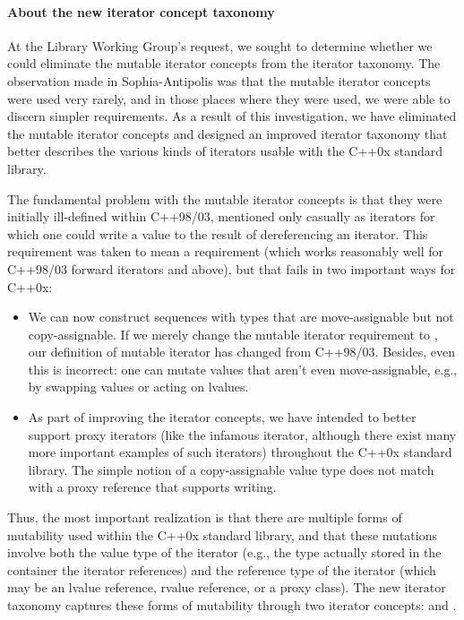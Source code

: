 \documentclass[american,twoside]{book}
\begin{document}
\begin{titlepage}
\paragraph*{About the new iterator concept taxonomy}
At the Library Working Group's request, we sought to determine whether
we could eliminate the mutable iterator concepts from the iterator
taxonomy. The observation made in Sophia-Antipolis was that the
mutable iterator concepts were used very rarely, and in those places
where they were used, we were able to discern simpler
requirements. As a result of this investigation, we have eliminated
the mutable iterator concepts and designed an improved iterator
taxonomy that better describes the various kinds of iterators usable
with the C++0x standard library.

The fundamental problem with the mutable iterator concepts is that
they were initially ill-defined within C++98/03, mentioned only
casually as iterators for which one could write a value to the result
of dereferencing an iterator. This requirement was taken to mean a
 requirement (which works reasonably well for
C++98/03 forward iterators and above), but that fails in two important
ways for C++0x:

\begin{itemize}
\item We can now construct sequences with types that are
  move-assignable but not copy-assignable. If we merely change the
  mutable iterator requirement to , our
  definition of mutable iterator has changed from C++98/03. Besides,
  even this is incorrect: one can mutate values that aren't even
  move-assignable, e.g., by swapping values or acting on lvalues.

\item As part of improving the iterator concepts, we have intended to
  better support proxy iterators (like the infamous
   iterator, although there exist many more
  important examples of such iterators) throughout the C++0x standard
  library. The simple notion of a copy-assignable value type does not
  match with a proxy reference that supports writing.
\end{itemize}

Thus, the most important realization is that there are multiple forms
of mutability used within the C++0x standard library, and that these
mutations involve both the value type of the iterator (e.g., the type
actually stored in the container the iterator references) and the
reference type of the iterator (which may be an lvalue reference,
rvalue reference, or a proxy class). The new iterator taxonomy
captures these forms of mutability through two iterator concepts:
 and .


\end{titlepage}
\end{document}

